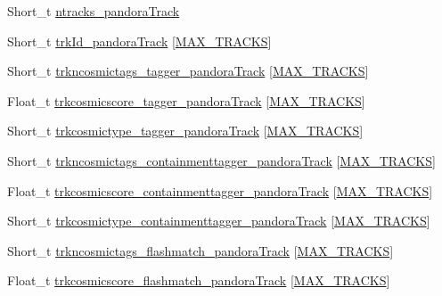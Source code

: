 \begin{DoxyCompactItemize}
\item 
Short\-\_\-t \hyperlink{classanatree_aba7a2fc1d504be3fd87f32245ccd56c5}{ntracks\-\_\-pandora\-Track}
\item 
Short\-\_\-t \hyperlink{classanatree_acc16f3ca1721c1b25f12d3d6aa418665}{trk\-Id\-\_\-pandora\-Track} \mbox{[}\hyperlink{anatree__core__v09410002__orig_8h_a327fd4e796e4a0d78947524c96e4362e}{M\-A\-X\-\_\-\-T\-R\-A\-C\-K\-S}\mbox{]}
\item 
Short\-\_\-t \hyperlink{classanatree_a8502a80cca87ae93dcbc0619b539ed24}{trkncosmictags\-\_\-tagger\-\_\-pandora\-Track} \mbox{[}\hyperlink{anatree__core__v09410002__orig_8h_a327fd4e796e4a0d78947524c96e4362e}{M\-A\-X\-\_\-\-T\-R\-A\-C\-K\-S}\mbox{]}
\item 
Float\-\_\-t \hyperlink{classanatree_a68274dba0d5fdd18e04edb86e84b918f}{trkcosmicscore\-\_\-tagger\-\_\-pandora\-Track} \mbox{[}\hyperlink{anatree__core__v09410002__orig_8h_a327fd4e796e4a0d78947524c96e4362e}{M\-A\-X\-\_\-\-T\-R\-A\-C\-K\-S}\mbox{]}
\item 
Short\-\_\-t \hyperlink{classanatree_aeb0bcbc98bb154bc0ab3869b3b2f64f5}{trkcosmictype\-\_\-tagger\-\_\-pandora\-Track} \mbox{[}\hyperlink{anatree__core__v09410002__orig_8h_a327fd4e796e4a0d78947524c96e4362e}{M\-A\-X\-\_\-\-T\-R\-A\-C\-K\-S}\mbox{]}
\item 
Short\-\_\-t \hyperlink{classanatree_abd7bb94b6c4a5d6661d5d5b935b39306}{trkncosmictags\-\_\-containmenttagger\-\_\-pandora\-Track} \mbox{[}\hyperlink{anatree__core__v09410002__orig_8h_a327fd4e796e4a0d78947524c96e4362e}{M\-A\-X\-\_\-\-T\-R\-A\-C\-K\-S}\mbox{]}
\item 
Float\-\_\-t \hyperlink{classanatree_aaf70426c18fe33ee7e59fded27917fd2}{trkcosmicscore\-\_\-containmenttagger\-\_\-pandora\-Track} \mbox{[}\hyperlink{anatree__core__v09410002__orig_8h_a327fd4e796e4a0d78947524c96e4362e}{M\-A\-X\-\_\-\-T\-R\-A\-C\-K\-S}\mbox{]}
\item 
Short\-\_\-t \hyperlink{classanatree_a84162faaef9881a405db1feeba798e38}{trkcosmictype\-\_\-containmenttagger\-\_\-pandora\-Track} \mbox{[}\hyperlink{anatree__core__v09410002__orig_8h_a327fd4e796e4a0d78947524c96e4362e}{M\-A\-X\-\_\-\-T\-R\-A\-C\-K\-S}\mbox{]}
\item 
Short\-\_\-t \hyperlink{classanatree_a5b74564fd30cd13b6bfa1dd2c7bb23b2}{trkncosmictags\-\_\-flashmatch\-\_\-pandora\-Track} \mbox{[}\hyperlink{anatree__core__v09410002__orig_8h_a327fd4e796e4a0d78947524c96e4362e}{M\-A\-X\-\_\-\-T\-R\-A\-C\-K\-S}\mbox{]}
\item 
Float\-\_\-t \hyperlink{classanatree_ab1de853f7c86b9f526671436a6e2de40}{trkcosmicscore\-\_\-flashmatch\-\_\-pandora\-Track} \mbox{[}\hyperlink{anatree__core__v09410002__orig_8h_a327fd4e796e4a0d78947524c96e4362e}{M\-A\-X\-\_\-\-T\-R\-A\-C\-K\-S}\mbox{]}

\end{DoxyCompactItemize}
